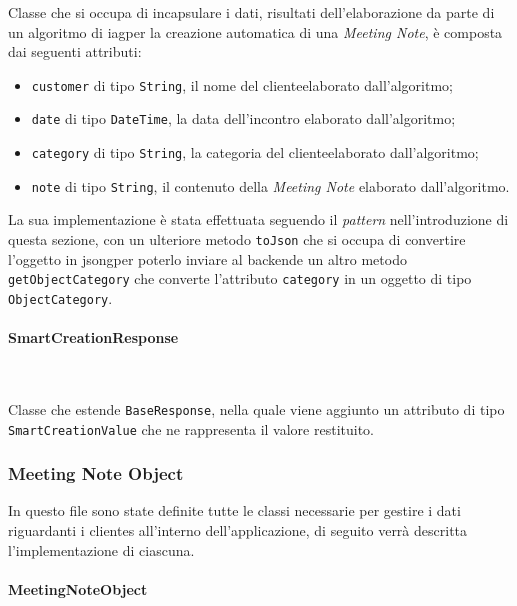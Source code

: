 \noindent Classe che si occupa di incapsulare i dati, risultati dell'elaborazione da parte di un algoritmo di \gls{iag}\glsoccur per la creazione automatica di una \emph{Meeting Note}, è composta dai seguenti attributi:
\begin{itemize}
    \item \lstinline{customer} di tipo \lstinline{String}, il nome del \gls{cliente}\glsoccur elaborato dall'algoritmo;
    \item \lstinline{date} di tipo \lstinline{DateTime}, la data dell'incontro elaborato dall'algoritmo;
    \item \lstinline{category} di tipo \lstinline{String}, la categoria del \gls{cliente}\glsoccur elaborato dall'algoritmo;
    \item \lstinline{note} di tipo \lstinline{String}, il contenuto della \emph{Meeting Note} elaborato dall'algoritmo.
\end{itemize}
La sua implementazione è stata effettuata seguendo il \emph{pattern} nell'introduzione di questa sezione, con un ulteriore metodo \lstinline{toJson} che si occupa di convertire l'oggetto in \gls{jsong}\glsoccur per poterlo inviare al \gls{backend}\glsoccur e un altro metodo \lstinline{getObjectCategory} che converte l'attributo \lstinline{category} in un oggetto di tipo \lstinline{ObjectCategory}.

\paragraph*{SmartCreationResponse} ~ \\
\label{par:smart-creation-response}

\noindent Classe che estende \lstinline{BaseResponse}, nella quale viene aggiunto un attributo di tipo \lstinline{SmartCreationValue} che ne rappresenta il valore restituito.

\subsubsection*{Meeting Note Object}
\label{subsubsec:meeting-note-object}

In questo file sono state definite tutte le classi necessarie per gestire i dati riguardanti i \glspl{cliente} all'interno dell'applicazione, di seguito verrà descritta l'implementazione di ciascuna.

\paragraph*{MeetingNoteObject} ~ \\
\label{par:meeting-note-object}

